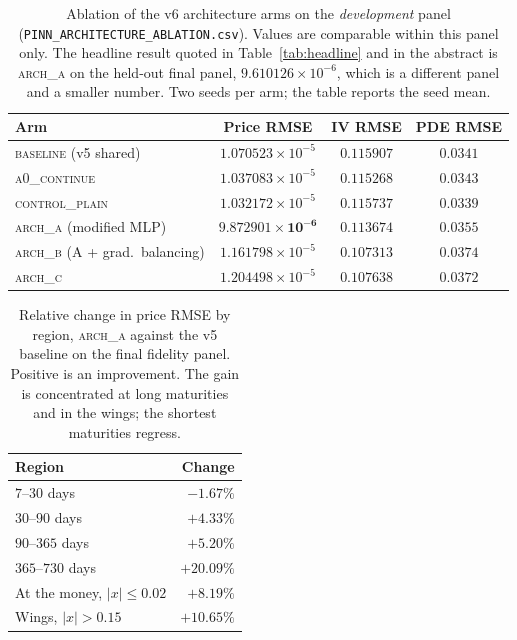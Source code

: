 \begin{table}[t]
\centering
\caption{Ablation of the v6 architecture arms on the \emph{development} panel
(\texttt{PINN\_ARCHITECTURE\_ABLATION.csv}). Values are comparable within this
panel only. The headline result quoted in Table~\ref{tab:headline} and in the
abstract is \textsc{arch\_a} on the held-out final panel,
$9.610126\times10^{-6}$, which is a different panel and a smaller number.
Two seeds per arm; the table reports the seed mean.}
\label{tab:ablation}
\begin{tabular}{lccc}
\toprule
Arm & Price RMSE & IV RMSE & PDE RMSE \\
\midrule
\textsc{baseline} (v5 shared)           & $1.070523\times10^{-5}$ & $0.115907$ & $0.0341$ \\
\textsc{a0\_continue}                   & $1.037083\times10^{-5}$ & $0.115268$ & $0.0343$ \\
\textsc{control\_plain}                 & $1.032172\times10^{-5}$ & $0.115737$ & $0.0339$ \\
\textsc{arch\_a} (modified MLP)         & $\mathbf{9.872901\times10^{-6}}$ & $0.113674$ & $0.0355$ \\
\textsc{arch\_b} (A + grad.\ balancing) & $1.161798\times10^{-5}$ & $\mathbf{0.107313}$ & $0.0374$ \\
\textsc{arch\_c}                        & $1.204498\times10^{-5}$ & $0.107638$ & $0.0372$ \\
\bottomrule
\end{tabular}
\end{table}


\begin{table}[t]
\centering
\caption{Relative change in price RMSE by region, \textsc{arch\_a} against the
v5 baseline on the final fidelity panel. Positive is an improvement. The gain
is concentrated at long maturities and in the wings; the shortest maturities
regress.}
\label{tab:regions}
\begin{tabular}{lr}
\toprule
Region & Change \\
\midrule
$7$--$30$ days      & $-1.67\%$ \\
$30$--$90$ days     & $+4.33\%$ \\
$90$--$365$ days    & $+5.20\%$ \\
$365$--$730$ days   & $\mathbf{+20.09\%}$ \\
\midrule
At the money, $|x|\le 0.02$ & $+8.19\%$ \\
Wings, $|x| > 0.15$         & $+10.65\%$ \\
\bottomrule
\end{tabular}
\end{table}


